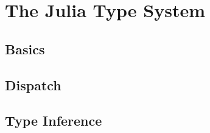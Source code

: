 \section{The Julia Type System}

\subsection{Basics}

\subsection{Dispatch}

\subsection{Type Inference}
